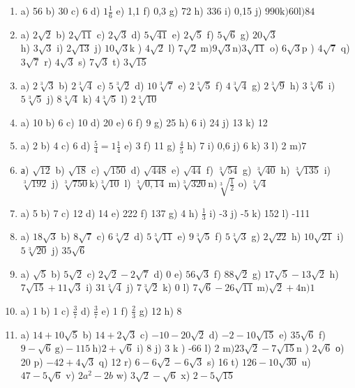 \documentclass[10pt]{article}
\begin{document}
\begin{enumerate}
  \item a) 56 b) 30 c) 6 d) \(1 \frac{1}{6}\) e) 1,1 f) 0,3 g) 72 h) 336 i) 0,15 j) \(990 \mathrm{k}) 60 \mathrm{l}) 84\)
  \item a) \(2 \sqrt{2}\) b) \(2 \sqrt{11}\) c) \(2 \sqrt{3}\) d) \(5 \sqrt{41}\) e) \(2 \sqrt{5}\) f) \(5 \sqrt{6}\) g) \(20 \sqrt{3}\)\\
h) \(3 \sqrt{3}\) i) \(2 \sqrt{13}\) j) \(10 \sqrt{3} \mathrm{k}\) ) \(4 \sqrt{2}\) l) \(7 \sqrt{2} \mathrm{~m}) 9 \sqrt{3} \mathrm{n}) 3 \sqrt{11}\) o) \(6 \sqrt{3} \mathrm{p}\) ) \(4 \sqrt{7}\) q) \(3 \sqrt{7}\) r) \(4 \sqrt{3}\) s) \(7 \sqrt{3}\) t) \(3 \sqrt{15}\)
  \item a) \(2 \sqrt[3]{3}\) b) \(2 \sqrt[3]{4}\) c) \(5 \sqrt[3]{2}\) d) \(10 \sqrt[3]{7}\) e) \(2 \sqrt[3]{5}\) f) \(4 \sqrt[3]{4}\) g) \(2 \sqrt[3]{9}\) h) \(3 \sqrt[3]{6}\) i) \(5 \sqrt[3]{5}\) j) \(8 \sqrt[3]{4}\) k) \(4 \sqrt[3]{5}\) l) \(2 \sqrt[3]{10}\)
  \item a) 10 b) 6 c) 10 d) 20 e) 6 f) 9 g) 25 h) 6 i) 24 j) 13 k) 12
  \item a) 2 b) 4 c) 6 d) \(\frac{5}{4}=1 \frac{1}{4}\) e) 3 f) 11 g) \(\frac{4}{5}\) h) 7 i) 0,6 j) 6 k) 3 l) 2 m\() 7\)
  \item а) \(\sqrt{12}\) b) \(\sqrt{18}\) c) \(\sqrt{150}\) d) \(\sqrt{448}\) e) \(\sqrt{44}\) f) \(\sqrt[3]{54}\) g) \(\sqrt[3]{40}\) h) \(\sqrt[3]{135}\) i) \(\sqrt[3]{192}\) j) \(\sqrt[3]{750} \mathrm{k}) \sqrt[3]{10}\) l) \(\sqrt[3]{0,14} \mathrm{~m}) \sqrt[3]{320} \mathrm{n}) \sqrt[3]{\frac{1}{2}}\) o) \(\sqrt[3]{4}\)
  \item a) 5 b) 7 c) 12 d) 14 e) 222 f) 137 g) 4 h) \(\frac{1}{3}\) i) -3 j) -5 k) 152 l) -111
  \item a) \(18 \sqrt{3}\) b) \(8 \sqrt{7}\) c) \(6 \sqrt[3]{2}\) d) \(5 \sqrt[3]{11}\) e) \(9 \sqrt[3]{5}\) f) \(5 \sqrt[3]{3}\) g) \(2 \sqrt{22}\) h) \(10 \sqrt{21}\) i) \(5 \sqrt[3]{20}\) j) \(35 \sqrt{6}\)
  \item a) \(\sqrt{5}\) b) \(5 \sqrt{2}\) c) \(2 \sqrt{2}-2 \sqrt{7}\) d) 0 e) \(56 \sqrt{3}\) f) \(88 \sqrt{2}\) g) \(17 \sqrt{5}-13 \sqrt{2}\) h) \(7 \sqrt{15}+11 \sqrt{3}\) i) \(31 \sqrt[3]{4}\) j) \(7 \sqrt[3]{2}\) k) 0 l) \(7 \sqrt{6}-26 \sqrt{11} \mathrm{~m}) \sqrt{2}+4 \mathrm{n}) 1\)
  \item a) 1 b) 1 c) \(\frac{3}{7}\) d) \(\frac{3}{7}\) e) 1 f) \(\frac{2}{3}\) g) 12 h) 8
  \item a) \(14+10 \sqrt{5}\) b) \(14+2 \sqrt{3}\) c) \(-10-20 \sqrt{2}\) d) \(-2-10 \sqrt{15}\) e) \(35 \sqrt{6}\) f) \(9-\sqrt{6} \mathrm{~g})-115 \mathrm{~h}) 2+\sqrt{6}\) i) 8 j) 3 k ) -66 l) 2 m\() 23 \sqrt{2}-7 \sqrt{15} \mathrm{n}\) ) \(2 \sqrt{6}\) о) 20 p) \(-42+4 \sqrt{3}\) q) 12 r) \(6-6 \sqrt{2}-6 \sqrt{3}\) s) 16 t) \(126-10 \sqrt{30}\) u) \(47-5 \sqrt{6}\) v) \(2 a^{2}-2 b\) w) \(3 \sqrt{2}-\sqrt{6}\) x) \(2-5 \sqrt{15}\)

\end{enumerate}
\end{document}
